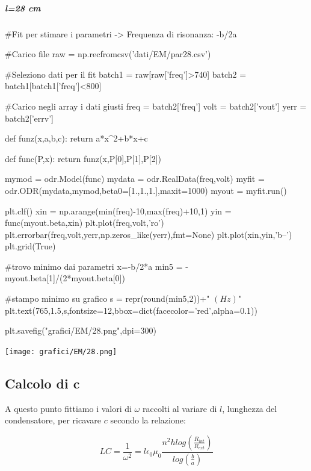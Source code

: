 \subparagraph*{l=28 cm}

\begin{sagesilent}
 #Fit per stimare i parametri -> Frequenza di risonanza: -b/2a

#Carico file
raw = np.recfromcsv('dati/EM/par28.csv')

#Seleziono dati per il fit
batch1 = raw[raw['freq']>740]
batch2 = batch1[batch1['freq']<800]

#Carico negli array i dati giusti
freq = batch2['freq']
volt = batch2['vout']
yerr = batch2['errv']


def funz(x,a,b,c):
    return a*x^2+b*x+c

def func(P,x):
    return funz(x,P[0],P[1],P[2])

mymod = odr.Model(func)
mydata = odr.RealData(freq,volt)
myfit = odr.ODR(mydata,mymod,beta0=[1.,1.,1.],maxit=1000)
myout = myfit.run()

plt.clf()
xin = np.arange(min(freq)-10,max(freq)+10,1)
yin = func(myout.beta,xin)
plt.plot(freq,volt,'ro')
plt.errorbar(freq,volt,yerr,np.zeros_like(yerr),fmt=None)
plt.plot(xin,yin,'b--')
plt.grid(True)

#trovo minimo dai parametri x=-b/2*a
min5 = -myout.beta[1]/(2*myout.beta[0]) 

#stampo minimo su grafico
s = repr(round(min5,2))+" $(Hz)$"
plt.text(765,1.5,s,fontsize=12,bbox=dict(facecolor='red',alpha=0.1))

plt.savefig("grafici/EM/28.png",dpi=300)
\end{sagesilent}



\texttt{[image: grafici/EM/28.png]}

\subsection*{Calcolo di c}

A questo punto fittiamo i valori di $\omega$ raccolti al variare di $l$, lunghezza del condensatore, per ricavare $c$ secondo la relazione:

\begin{equation}
 LC = \frac{1}{{\omega}^2} = l \epsilon_{0} \mu_{0} \frac{n^2 h log(\frac{R_{int}}{R_{ext}})}{log (\frac{b}{a})}
\end{equation}

